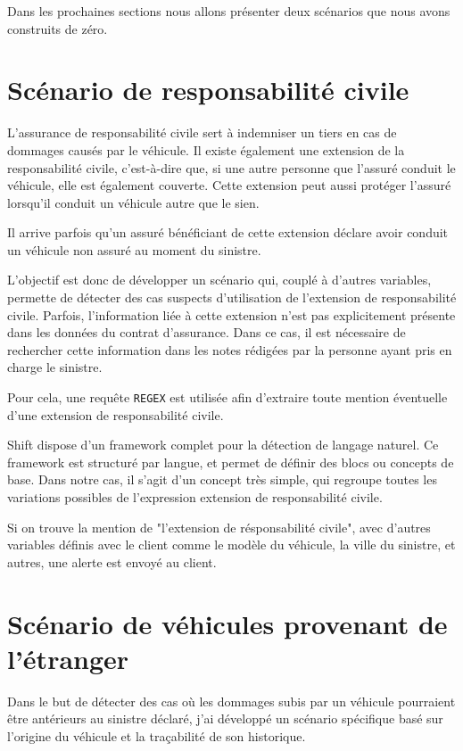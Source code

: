 \documentclass [twoside,openright,a4paper,11pt,french] {report}
\begin{document}
Dans les prochaines sections nous allons présenter deux scénarios que nous 
avons construits de zéro. 

\section{Scénario de responsabilité civile}

L'assurance de responsabilité civile sert à indemniser un tiers en cas de dommages 
causés par le véhicule. Il existe également une extension de la responsabilité civile, 
c'est-à-dire que, si une autre personne que l'assuré conduit le véhicule, elle est 
également couverte. Cette extension peut aussi protéger l'assuré lorsqu'il conduit un 
véhicule autre que le sien.

Il arrive parfois qu'un assuré bénéficiant de cette extension déclare avoir conduit un 
véhicule non assuré au moment du sinistre.

L'objectif est donc de développer un scénario qui, couplé à d'autres variables, permette 
de détecter des cas suspects d'utilisation de l'extension de responsabilité civile. 
Parfois, l'information liée à cette extension n'est pas explicitement présente dans les 
données du contrat d'assurance. Dans ce cas, il est nécessaire de rechercher cette 
information dans les notes rédigées par la personne ayant pris en charge le sinistre.

Pour cela, une requête \texttt{REGEX} est utilisée afin d'extraire toute mention 
éventuelle d'une extension de responsabilité civile.

Shift dispose d'un framework complet pour la détection de langage naturel. Ce framework 
est structuré par langue, et permet de définir des blocs ou concepts de base. Dans notre 
cas, il s'agit d'un concept très simple, qui regroupe toutes les variations possibles de 
l'expression \og extension de responsabilité civile\fg{}.

Si on trouve la mention de "l'extension de résponsabilité civile", avec d'autres variables
définis avec le client comme le modèle du véhicule, la ville du sinistre, 
et autres, une alerte est envoyé au client.

\section{Scénario de véhicules provenant de l'étranger}

Dans le but de détecter des cas où les dommages subis par un véhicule pourraient être 
antérieurs au sinistre déclaré, j'ai développé un scénario spécifique basé sur 
l'origine du véhicule et la traçabilité de son historique.
\end{document}
